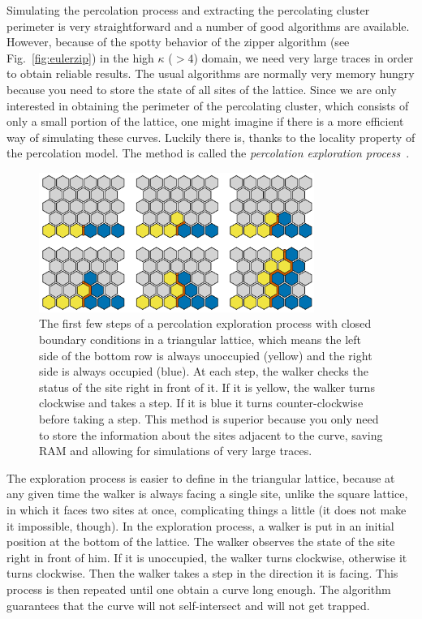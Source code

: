 Simulating the percolation process and extracting the percolating cluster
perimeter is very straightforward and a number of good algorithms are
available. However, because of the spotty behavior of the zipper algorithm (see
Fig.~\ref{fig:eulerzip}) in the high $\kappa$ ($>4$) domain, we need very large
traces in order to obtain reliable results. The usual algorithms are normally
very memory hungry because you need to store the state of all sites of the
lattice. Since we are only interested in obtaining the perimeter of the
percolating cluster, which consists of only a small portion of the lattice, one
might imagine if there is a more efficient way of simulating these curves.
Luckily there is, thanks to the locality property of the percolation model. The
method is called the \textit{percolation exploration process}~\cite{Cardy2005}.

\begin{figure}[b]
\begin{center}
    \includegraphics[width=0.8\textwidth]{chapters/ch6-asle/figs/explore}
\end{center}
\caption{The first few steps of a percolation exploration process with closed
    boundary conditions in a triangular lattice, which means the left side of
    the bottom row is always unoccupied (yellow) and the right side is always
    occupied (blue). At each step, the walker checks the status of the site
    right in front of it. If it is yellow, the walker turns clockwise and takes
    a step. If it is blue it turns counter-clockwise before taking a step. This
    method is superior because you only need to store the information about the
    sites adjacent to the curve, saving RAM and allowing for simulations of
    very large traces.}
\label{fig:explore}
\end{figure}


The exploration process is easier to define in the triangular lattice, because
at any given time the walker is always facing a single site, unlike the square
lattice, in which it faces two sites at once, complicating things a little (it
does not make it impossible, though). In the exploration process, a walker is
put in an initial position at the bottom of the lattice. The walker observes
the state of the site right in front of him. If it is unoccupied, the walker
turns clockwise, otherwise it turns clockwise. Then the walker takes a step in
the direction it is facing. This process is then repeated until one obtain a
curve long enough. The algorithm guarantees that the curve will not
self-intersect and will not get trapped.


